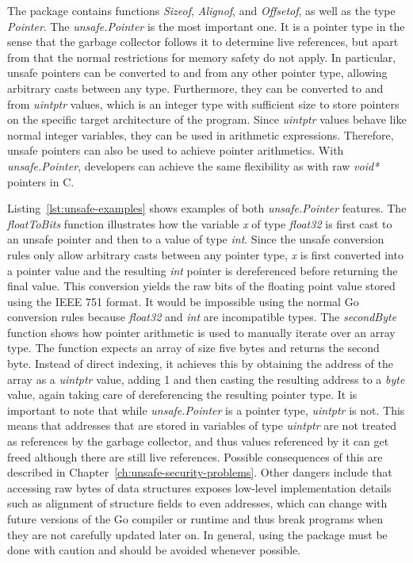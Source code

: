 The package contains  functions \textit{Sizeof}, \textit{Alignof}, and \textit{Offsetof}, as well as the
type \textit{Pointer}.
The \textit{unsafe.Pointer} is the most important one.
It is a pointer type in the sense that the garbage collector follows it to determine live references, but apart from
that the normal restrictions for memory safety do not apply.
In particular, unsafe pointers can be converted to and from any other pointer type, allowing arbitrary casts between
any type.
Furthermore, they can be converted to and from \textit{uintptr} values, which is an integer type with sufficient size
to store pointers on the specific target architecture of the program.
Since \textit{uintptr} values behave like normal integer variables, they can be used in arithmetic expressions.
Therefore, unsafe pointers can also be used to achieve pointer arithmetics.
With \textit{unsafe.Pointer}, developers can achieve the same flexibility as with raw \textit{void*} pointers in C.

Listing~\ref{lst:unsafe-examples} shows examples of both \textit{unsafe.Pointer} features.
The \textit{floatToBits} function illustrates how the variable \textit{x} of type \textit{float32} is first cast to an
unsafe pointer and then to a value of type \textit{int}.
Since the unsafe conversion rules only allow arbitrary casts between any pointer type, \textit{x} is first converted
into a pointer value and the resulting \textit{int} pointer is dereferenced before returning the final value.
This conversion yields the raw bits of the floating point value stored using the IEEE 751 format.
It would be impossible using the normal Go conversion rules because \textit{float32} and \textit{int} are incompatible
types.
The \textit{secondByte} function shows how pointer arithmetic is used to manually iterate over an array type.
The function expects an array of size five bytes and returns the second byte.
Instead of direct indexing, it achieves this by obtaining the address of the array as a \textit{uintptr} value, adding
1 and then casting the resulting address to a \textit{byte} value, again taking care of dereferencing the resulting
pointer type.
It is important to note that while \textit{unsafe.Pointer} is a pointer type, \textit{uintptr} is not.
This means that addresses that are stored in variables of type \textit{uintptr} are not treated as references by the
garbage collector, and thus values referenced by it can get freed although there are still live references.
Possible consequences of this are described in Chapter~\ref{ch:unsafe-security-problems}.
Other dangers include that accessing raw bytes of data structures exposes low-level implementation details such as
alignment of structure fields to even addresses, which can change with future versions of the Go compiler or runtime
and thus break programs when they are not carefully updated later on.
In general, using the \unsafe{} package must be done with caution and should be avoided whenever possible.

